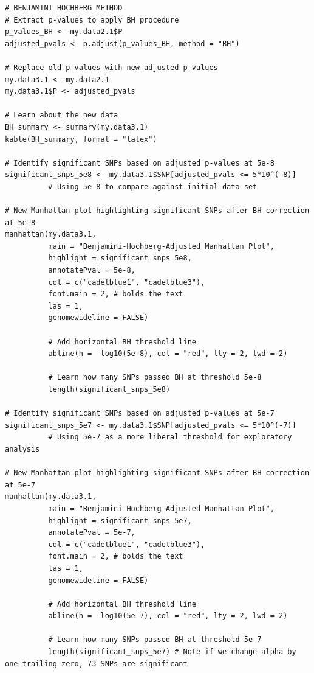 \documentclass[12pt]{article}
\begin{document}
\begin{lstlisting}[style=Rstyle]
# BENJAMINI HOCHBERG METHOD
# Extract p-values to apply BH procedure
p_values_BH <- my.data2.1$P
adjusted_pvals <- p.adjust(p_values_BH, method = "BH")

# Replace old p-values with new adjusted p-values
my.data3.1 <- my.data2.1
my.data3.1$P <- adjusted_pvals

# Learn about the new data
BH_summary <- summary(my.data3.1)
kable(BH_summary, format = "latex")

# Identify significant SNPs based on adjusted p-values at 5e-8
significant_snps_5e8 <- my.data3.1$SNP[adjusted_pvals <= 5*10^(-8)] 
          # Using 5e-8 to compare against initial data set

# New Manhattan plot highlighting significant SNPs after BH correction at 5e-8
manhattan(my.data3.1,
          main = "Benjamini-Hochberg-Adjusted Manhattan Plot",
          highlight = significant_snps_5e8,
          annotatePval = 5e-8,
          col = c("cadetblue1", "cadetblue3"),
          font.main = 2, # bolds the text
          las = 1,
          genomewideline = FALSE)

          # Add horizontal BH threshold line
          abline(h = -log10(5e-8), col = "red", lty = 2, lwd = 2)
          
          # Learn how many SNPs passed BH at threshold 5e-8
          length(significant_snps_5e8)

# Identify significant SNPs based on adjusted p-values at 5e-7
significant_snps_5e7 <- my.data3.1$SNP[adjusted_pvals <= 5*10^(-7)] 
          # Using 5e-7 as a more liberal threshold for exploratory analysis

# New Manhattan plot highlighting significant SNPs after BH correction at 5e-7
manhattan(my.data3.1,
          main = "Benjamini-Hochberg-Adjusted Manhattan Plot",
          highlight = significant_snps_5e7,
          annotatePval = 5e-7,
          col = c("cadetblue1", "cadetblue3"),
          font.main = 2, # bolds the text
          las = 1,
          genomewideline = FALSE)

          # Add horizontal BH threshold line
          abline(h = -log10(5e-7), col = "red", lty = 2, lwd = 2) 

          # Learn how many SNPs passed BH at threshold 5e-7
          length(significant_snps_5e7) # Note if we change alpha by one trailing zero, 73 SNPs are significant
\end{lstlisting}
\clearpage
\end{document}
